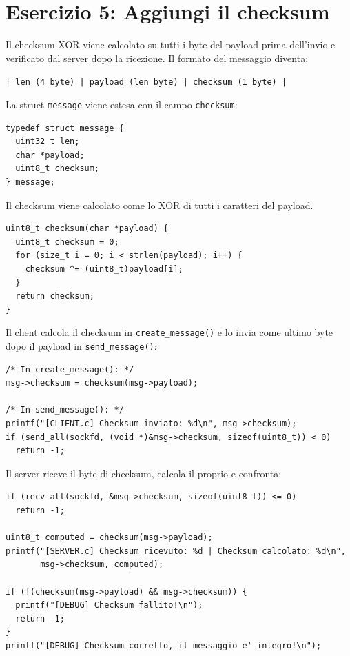 \documentclass[a4paper,12pt]{article}
\begin{document}
\section{Esercizio 5: Aggiungi il checksum}

Il checksum XOR viene calcolato su tutti i byte del payload prima dell'invio e verificato
dal server dopo la ricezione. Il formato del messaggio diventa:

\begin{center}
\texttt{| len (4 byte) | payload (len byte) | checksum (1 byte) |}
\end{center}

La struct \texttt{message} viene estesa con il campo \texttt{checksum}:

\begin{lstlisting}[caption={Struct message con checksum}]
typedef struct message {
  uint32_t len;
  char *payload;
  uint8_t checksum;
} message;
\end{lstlisting}

\newpage
Il checksum viene calcolato come lo XOR di tutti i caratteri del payload.
\begin{lstlisting}[caption={Calcolo checksum XOR}]
uint8_t checksum(char *payload) {
  uint8_t checksum = 0;
  for (size_t i = 0; i < strlen(payload); i++) {
    checksum ^= (uint8_t)payload[i];
  }
  return checksum;
}
\end{lstlisting}

Il client calcola il checksum in \texttt{create\_message()} e lo invia come ultimo byte
dopo il payload in \texttt{send\_message()}:

\begin{lstlisting}[caption={Invio checksum -- client}]
/* In create_message(): */
msg->checksum = checksum(msg->payload);

/* In send_message(): */
printf("[CLIENT.c] Checksum inviato: %d\n", msg->checksum);
if (send_all(sockfd, (void *)&msg->checksum, sizeof(uint8_t)) < 0)
  return -1;
\end{lstlisting}

Il server riceve il byte di checksum, calcola il proprio e confronta:

\begin{lstlisting}[caption={Verifica checksum -- server}]
if (recv_all(sockfd, &msg->checksum, sizeof(uint8_t)) <= 0)
  return -1;

uint8_t computed = checksum(msg->payload);
printf("[SERVER.c] Checksum ricevuto: %d | Checksum calcolato: %d\n",
       msg->checksum, computed);

if (!(checksum(msg->payload) && msg->checksum)) {
  printf("[DEBUG] Checksum fallito!\n");
  return -1;
}
printf("[DEBUG] Checksum corretto, il messaggio e' integro!\n");
\end{lstlisting}
\end{document}
